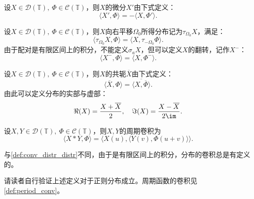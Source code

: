 \begin{definition}[分布的微分]
    设$X\in\mathcal{D}(\mathbb{T}),\ \Phi\in\mathcal{C}(\mathbb{T})$，则$X$的微分$X'$由下式定义：
    \begin{equation}
        \langle X',\Phi\rangle=-\langle X,\Phi'\rangle.
    \end{equation}
\end{definition}

\begin{definition}[分布的平移与伸缩]
    设$X\in\mathcal{D}(\mathbb{T}),\ \Phi\in\mathcal{C}(\mathbb{T})$，则$X$向右平移$\Omega_0$所得分布记为$\tau_{\Omega_0}X$，满足：
    \begin{equation}
        \langle \tau_{\Omega_0}X,\Phi\rangle=\langle X,\tau_{-\Omega_0}\Phi\rangle.
    \end{equation}
    由于配对是有限区间上的积分，不能定义$\sigma_a X$，但可以定义$X$的翻转，记作$X^-$：
    \begin{equation}
        \langle X^-,\Phi\rangle=\langle X,\Phi^-\rangle.
    \end{equation}
\end{definition}

\begin{definition}[分布的共轭]
    设$X\in\mathcal{D}(\mathbb{T}),\ \Phi\in\mathcal{C}(\mathbb{T})$，则$X$的共轭$\overline{X}$由下式定义：
    \begin{equation}
        \langle \overline{X},\Phi\rangle=\overline{\langle X,\overline{\Phi}\rangle}.
    \end{equation}
    由此可以定义分布的实部与虚部：
    \begin{equation}
        \Re(X)=\frac{X+\overline{X}}{2},\quad \Im(X)=\frac{X-\overline{X}}{2\im}.
    \end{equation}
\end{definition}

\begin{definition}[分布的卷积]
    设$X,Y\in\mathcal{D}(\mathbb{T}),\ \Phi\in\mathcal{C}(\mathbb{T})$，则$X,Y$的周期卷积为
    \begin{equation}
        \langle X*Y,\Phi\rangle=\langle X(u),\langle Y(v),\Phi(u+v)\rangle\rangle.
    \end{equation}
\end{definition}
与\cref{def:conv_distr_distr}不同，由于是有限区间上的积分，分布的卷积总是有定义的。%

请读者自行验证上述定义对于正则分布成立。周期函数的卷积见\cref{def:period_conv}。

